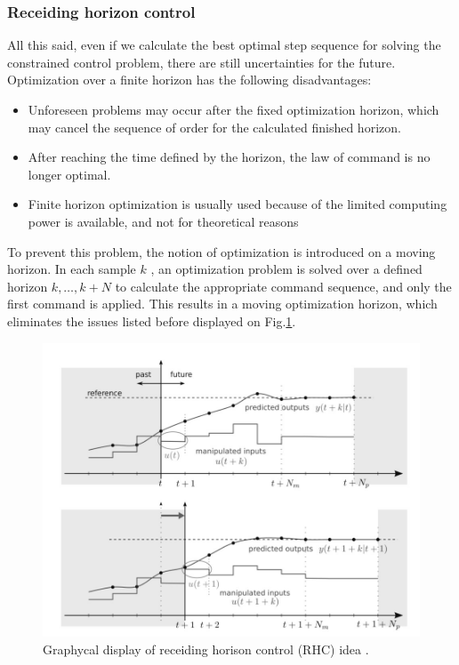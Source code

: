     \subsubsection{Receiding horizon control}\label{BASICCSR:sec:RHC}

    All this said, even if we calculate the best optimal step sequence for solving the constrained control problem, there are still uncertainties for the future. Optimization over a finite horizon has the following disadvantages:
		
		\begin{itemize}
			\item Unforeseen problems may occur after the fixed optimization horizon, which may cancel the sequence of order for the 		calculated finished horizon.
		\item After reaching the time defined by the horizon, the law of command is no longer optimal.
		\item Finite horizon optimization is usually used because of the limited computing power is available, and not for theoretical reasons
		\end{itemize}
		
		To prevent this problem, the notion of optimization is introduced on a moving horizon. In each sample $k$ , an optimization problem is solved over a defined horizon $k,\dots,k+N$ to calculate the appropriate command sequence, and only the first command is applied. This results in a moving optimization horizon, which eliminates the issues listed before displayed on Fig.\ref{BASICCSR:fig:RHC}. \\

\begin{figure}[!ht]
        \centering
        \includegraphics[width=.9\textwidth]{EMPC_PNG_Pics/RHC_gray.jpg}
        \caption{Graphycal display of receiding horison control (RHC) idea \cite{borrelli2017predictive}.}
        \label{BASICCSR:fig:RHC}
    \end{figure}

